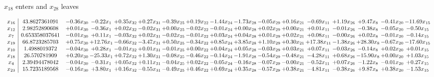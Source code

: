 \documentclass[9pt]{article}
\begin{document}
 $ x_{18} $ enters and $ x_{28} $ leaves 

 \[\begin{array}{c| c c@{\hskip 2pt} c@{\hskip 2pt} c@{\hskip 2pt} c@{\hskip 2pt} c@{\hskip 2pt} c@{\hskip 2pt} c@{\hskip 2pt} c@{\hskip 2pt} c@{\hskip 2pt} c@{\hskip 2pt} c@{\hskip 2pt} c@{\hskip 2pt} c@{\hskip 2pt} c@{\hskip 2pt} c@{\hskip 2pt} }
 x_{16}   &  43.8627361091 & -0.36 x_{30} & -0.22 x_{1} & +  0.35 x_{32} & +  0.27 x_{31} & -0.39 x_{25} & +  0.19 x_{22} & -1.44 x_{24} & -1.73 x_{28} & -0.05 x_{29} & +  0.16 x_{21} & -0.69 x_{11} & +  1.19 x_{26} & +  9.47 x_{8} & -0.41 x_{20} & -11.69 x_{15}\\
 x_{12}   &  2.98252890608 & +  0.01 x_{30} & -0.36 x_{1} & +  0.02 x_{32} & -0.02 x_{31} & +  0.00 x_{25} & -0.02 x_{22} & -0.01 x_{24} & +  0.00 x_{28} & +  0.02 x_{29} & +  0.00 x_{21} & +  0.01 x_{11} & -0.01 x_{26} & -0.38 x_{8} & -0.05 x_{20} & -0.50 x_{15}\\
 x_{7}   &  0.653358037641 & -0.01 x_{30} & +  0.11 x_{1} & -0.03 x_{32} & +  0.02 x_{31} & -0.02 x_{25} & -0.01 x_{22} & +  0.03 x_{24} & +  0.04 x_{28} & +  0.01 x_{29} & +  0.02 x_{21} & +  0.08 x_{11} & -0.00 x_{26} & +  0.02 x_{8} & -0.01 x_{20} & -0.14 x_{15}\\
 x_{19}   &  66.8723285703 & +  0.75 x_{30} & + 12.76 x_{1} & -0.66 x_{32} & -3.47 x_{31} & +  0.50 x_{25} & -0.34 x_{22} & +  0.85 x_{24} & +  3.85 x_{28} & +  1.10 x_{29} & +  0.30 x_{21} & + 17.38 x_{11} & -1.38 x_{26} & + 28.30 x_{8} & -0.67 x_{20} & -17.60 x_{15}\\
 x_{10}   &  1.4988019372 & -0.04 x_{30} & +  0.28 x_{1} & -0.01 x_{32} & +  0.01 x_{31} & -0.01 x_{25} & +  0.00 x_{22} & +  0.04 x_{24} & +  0.05 x_{28} & -0.03 x_{29} & +  0.03 x_{21} & +  0.07 x_{11} & -0.03 x_{26} & -0.14 x_{8} & +  0.02 x_{20} & +  0.01 x_{15}\\
 x_{18}   &  26.570781909 & +  0.20 x_{30} & -25.33 x_{1} & +  0.72 x_{32} & +  1.30 x_{31} & -0.08 x_{25} & -0.46 x_{22} & -0.14 x_{24} & -1.91 x_{28} & -0.54 x_{29} & -0.48 x_{21} & -4.28 x_{11} & +  0.68 x_{26} & -15.90 x_{8} & +  0.00 x_{20} & +  1.03 x_{15}\\
 x_{4}   &  2.39494478042 & -0.04 x_{30} & -0.31 x_{1} & +  0.05 x_{32} & +  0.11 x_{31} & -0.04 x_{25} & +  0.02 x_{22} & -0.05 x_{24} & -0.16 x_{28} & -0.07 x_{29} & -0.00 x_{21} & -0.52 x_{11} & +  0.07 x_{26} & -1.22 x_{8} & -0.01 x_{20} & +  0.27 x_{15}\\
 x_{23}   &  15.7235189568 & -0.16 x_{30} & +  3.80 x_{1} & +  0.16 x_{32} & -0.55 x_{31} & -0.49 x_{25} & +  0.46 x_{22} & +  0.69 x_{24} & +  0.35 x_{28} & -0.57 x_{29} & +  0.38 x_{21} & -4.81 x_{11} & -0.38 x_{26} & +  9.87 x_{8} & +  0.38 x_{20} & -1.53 x_{15}\\

\end{array}\]
\end{document}
